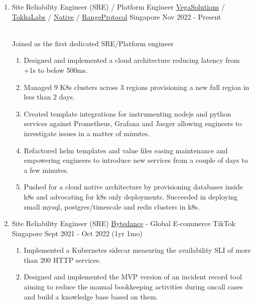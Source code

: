 \documentclass{CVSoftwareEngineer}
\begin{document}
	\begin{enumerate}[labelwidth=!, labelindent=0pt, leftmargin=*, rightmargin=15pt]

		\item[] \cvExperience
			{Site Reliability Engineer (SRE) / Platform Engineer}
			{\href{https://vegasolutions.co}{VegaSolutions} / \href{https://tokkalabs.com}{TokkaLabs} / \href{https://native.org/}{Native} / \href{https://www.rangeprotocol.com/}{RangeProtocol}}
			{Singapore}
			{Nov 2022 - Present}
			{
				\\ Joined as the first dedicated SRE/Platform engineer
				\begin{enumerate}[labelwidth=!, labelindent=0pt, nosep, leftmargin=*]
					\item[\textasteriskcentered] Designed and implemented a cloud architecture reducing
						latency from +1s to below 500ms.
					\item[\textasteriskcentered] Managed 9 K8s clusters across 3 regions provisioning a new full region in less than 2 days.
					\item[\textasteriskcentered] Created template integrations for instrumenting nodejs and python services
						against Prometheus, Grafana and Jaeger allowing engineers to investigate issues in a matter of minutes.
					\item[\textasteriskcentered] Refactored helm templates and value files easing maintenance and empowering
						engineers to introduce new services from a couple of days to a few minutes.
						\item[\textasteriskcentered] Pushed for a cloud native architecture by provisioning databases inside k8s
						and advocating for k8s only deployments. Succeeded in deploying small mysql, postgres/timescale and redis
						clusters in k8s.
				\end{enumerate}
			}

		\item[] \cvExperience
			{Site Reliability Engineer (SRE)}
			{\href{https://www.bytedance.com/en}{Bytedance} - Global E-commerce TikTok}
			{Singapore}
			{Sept 2021 - Oct 2022 (1yr 1mo)}
			{
				\begin{enumerate}[labelwidth=!, labelindent=0pt, nosep, leftmargin=*]
					\item[\textasteriskcentered] Implemented a Kubernetes sidecar measuring the availability SLI of more than 200 HTTP services.
					\item[\textasteriskcentered] Designed and implemented the MVP version of an incident record tool aiming to reduce the manual bookkeeping activities during oncall cases and build a knowledge base based on them.
				\end{enumerate}
			}


\end{enumerate}
\end{document}
